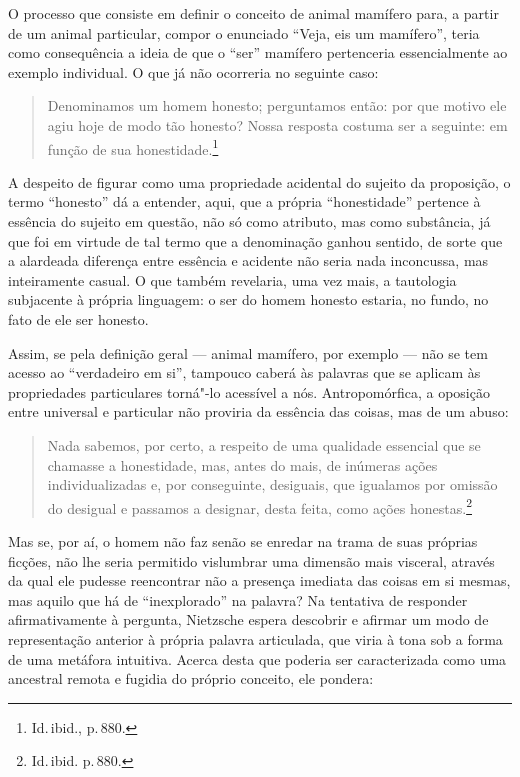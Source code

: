 O processo que consiste em definir o conceito de animal mamífero para,
a partir de um animal particular, compor o enunciado “Veja,
eis um mamífero”, teria como consequência a ideia de que o “ser”
mamífero pertenceria essencialmente ao exemplo individual. O que já não
ocorreria no seguinte caso: 

\begin{quote}
Denominamos um homem honesto; perguntamos então: 
por que motivo ele agiu hoje de modo tão
honesto? Nossa resposta costuma ser a seguinte: em função de sua
honestidade.\footnote{ Id.\,ibid., p.\,880.}

\end{quote}
A despeito de
figurar como uma propriedade acidental do sujeito da proposição, o
termo “honesto” dá a entender, aqui, que a própria “honestidade”
pertence à essência do sujeito em questão, não só como atributo, mas
como substância, já que foi em virtude de tal termo que a denominação
ganhou sentido, de sorte que a alardeada diferença entre essência e
acidente não seria nada inconcussa, mas inteiramente casual. O que
também revelaria, uma vez mais, a tautologia subjacente à própria
linguagem: o ser do homem honesto estaria, no fundo, no fato de ele ser
honesto.

Assim, se pela definição geral --- animal mamífero, por exemplo --- não se
tem acesso ao “verdadeiro em si”, tampouco caberá às palavras
que se aplicam às propriedades particulares torná"-lo acessível a nós.
Antropomórfica, a oposição entre universal e particular não proviria da
essência das coisas, mas de um abuso: 

\begin{quote}
Nada sabemos, por
certo, a respeito de uma qualidade essencial que se chamasse a
honestidade, mas, antes do mais, de inúmeras ações individualizadas e,
por conseguinte, desiguais, que igualamos por omissão do desigual e
passamos a designar, desta feita, como ações
honestas.\footnote{ Id.\,ibid. p.\,880.}
\end{quote}

Mas se, por aí, o homem não faz senão se enredar na trama de suas
próprias ficções, não lhe seria permitido vislumbrar uma dimensão mais
visceral, através da qual ele pudesse reencontrar não a presença
imediata das coisas em si mesmas, mas aquilo que há de “inexplorado” na
palavra? Na tentativa de responder afirmativamente à pergunta,
Nietzsche espera descobrir e afirmar um modo de representação anterior
à própria palavra articulada, que viria à tona sob a forma de uma
metáfora intuitiva. Acerca desta que poderia ser caracterizada como uma
ancestral remota e fugidia do próprio conceito, ele pondera:

